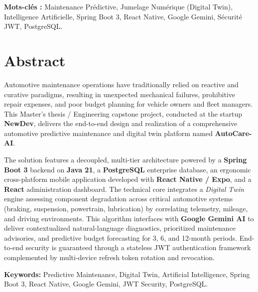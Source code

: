 \documentclass[12pt,a4paper,twoside,openright]{report}
\begin{document}
  \vspace{0.5cm}
  \noindent\textbf{Mots-cl\'es :} Maintenance Pr\'edictive, Jumelage Num\'erique (Digital Twin), Intelligence Artificielle, Spring Boot 3, React Native, Google Gemini, S\'ecurit\'e JWT, PostgreSQL.

  \vspace{1.5cm}

  \chapter*{Abstract}

  Automotive maintenance operations have traditionally relied on reactive and curative paradigms, resulting in unexpected mechanical failures, prohibitive repair expenses, and poor budget planning for vehicle owners and fleet managers. This Master's thesis / Engineering capstone project, conducted at the startup \textbf{NewDev}, delivers the end-to-end design and realization of a comprehensive automotive predictive maintenance and digital twin platform named \textbf{AutoCare-AI}.

  The solution features a decoupled, multi-tier architecture powered by a \textbf{Spring Boot 3} backend on \textbf{Java 21}, a \textbf{PostgreSQL} enterprise database, an ergonomic cross-platform mobile application developed with \textbf{React Native / Expo}, and a \textbf{React} administration dashboard. The technical core integrates a \textit{Digital Twin} engine assessing component degradation across critical automotive systems (braking, suspension, powertrain, lubrication) by correlating telemetry, mileage, and driving environments. This algorithm interfaces with \textbf{Google Gemini AI} to deliver contextualized natural-language diagnostics, prioritized maintenance advisories, and predictive budget forecasting for 3, 6, and 12-month periods. End-to-end security is guaranteed through a stateless JWT authentication framework complemented by multi-device refresh token rotation and revocation.

  \vspace{0.5cm}
  \noindent\textbf{Keywords:} Predictive Maintenance, Digital Twin, Artificial Intelligence, Spring Boot 3, React Native, Google Gemini, JWT Security, PostgreSQL.

  \newpage

  \tableofcontents
  \newpage
  \listoffigures
  \newpage
  \listoftables
  \newpage
\end{document}
